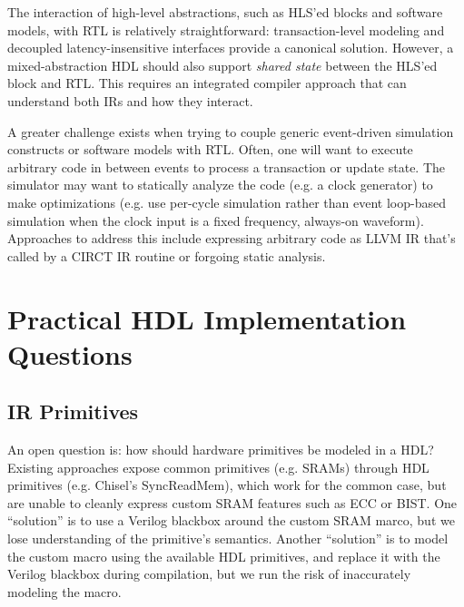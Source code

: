 \documentclass[sigplan,review,nonacm]{acmart}
\begin{document}
The interaction of high-level abstractions, such as HLS'ed blocks and software models, with RTL is relatively straightforward: transaction-level modeling and decoupled latency-insensitive interfaces provide a canonical solution\cite{umoc}.
However, a mixed-abstraction HDL should also support \textit{shared state} between the HLS'ed block and RTL.
This requires an integrated compiler approach that can understand both IRs and how they interact.

A greater challenge exists when trying to couple generic event-driven simulation constructs or software models with RTL.
Often, one will want to execute arbitrary code in between events to process a transaction or update state.
The simulator may want to statically analyze the code (e.g. a clock generator) to make optimizations (e.g. use per-cycle simulation rather than event loop-based simulation when the clock input is a fixed frequency, always-on waveform).
Approaches to address this include expressing arbitrary code as LLVM IR that's called by a CIRCT IR routine or forgoing static analysis.

\section{Practical HDL Implementation Questions}


\subsection{IR Primitives}


An open question is: how should hardware primitives be modeled in a HDL?
Existing approaches expose common primitives (e.g. SRAMs) through HDL primitives (e.g. Chisel's SyncReadMem), which work for the common case, but are unable to cleanly express custom SRAM features such as ECC or BIST.
One ``solution'' is to use a Verilog blackbox around the custom SRAM marco, but we lose understanding of the primitive's semantics.
Another ``solution'' is to model the custom macro using the available HDL primitives, and replace it with the Verilog blackbox during compilation, but we run the risk of inaccurately modeling the macro.
\end{document}
